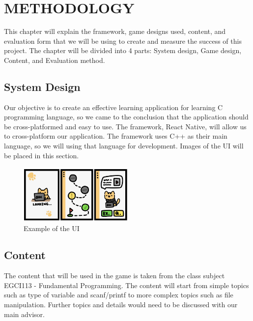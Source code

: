 \chapter{METHODOLOGY}
This chapter will explain the framework, game designs used, content, and evaluation form that we will be using to create and measure the success of this project. The chapter will be divided into 4 parts: System design, Game design, Content, and Evaluation method.

\section{System Design}
Our objective is to create an effective learning application for learning C programming language, so we came to the conclusion that the application should be cross-platformed and easy to use. The framework, React Native, will allow us to cross-platform our application. The framework uses C++ as their main language, so we will using that language for development. Images of the UI will be placed in this section.
    \begin{figure}[!htbp]
    	\centering
    	\includegraphics[width = 0.5\textwidth]{UI.png}
    	\caption{Example of the UI}
    	\label{fig:UIExample}
    \end{figure}

\section{Content}
The content that will be used in the game is taken from the class subject EGCI113 - Fundamental Programming. The content will start from simple topics such as type of variable and scanf/printf to more complex topics such as file manipulation. Further topics and details would need to be discussed with our main advisor.

